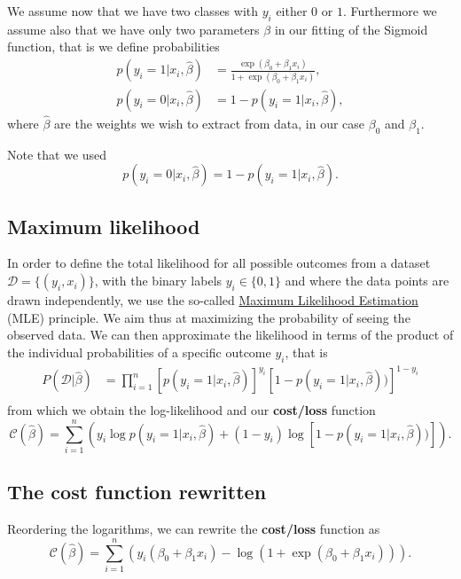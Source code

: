 \documentclass[%
oneside,                 %
final,                   %
10pt]{article}
\begin{document}
We assume now that we have two classes with $y_i$ either $0$ or $1$. Furthermore we assume also that we have only two parameters $\beta$ in our fitting of the Sigmoid function, that is we define probabilities 
\begin{align*}
p(y_i=1|x_i,\hat{\beta}) &= \frac{\exp{(\beta_0+\beta_1x_i)}}{1+\exp{(\beta_0+\beta_1x_i)}},\nonumber\\
p(y_i=0|x_i,\hat{\beta}) &= 1 - p(y_i=1|x_i,\hat{\beta}),
\end{align*}
where $\hat{\beta}$ are the weights we wish to extract from data, in our case $\beta_0$ and $\beta_1$. 

Note that we used
\[
p(y_i=0\vert x_i, \hat{\beta}) = 1-p(y_i=1\vert x_i, \hat{\beta}).
\]

\subsection*{Maximum likelihood}

In order to define the total likelihood for all possible outcomes from a  
dataset $\mathcal{D}=\{(y_i,x_i)\}$, with the binary labels
$y_i\in\{0,1\}$ and where the data points are drawn independently, we use the so-called \href{{https://en.wikipedia.org/wiki/Maximum_likelihood_estimation}}{Maximum Likelihood Estimation} (MLE) principle. 
We aim thus at maximizing 
the probability of seeing the observed data. We can then approximate the 
likelihood in terms of the product of the individual probabilities of a specific outcome $y_i$, that is 
\begin{align*}
P(\mathcal{D}|\hat{\beta})& = \prod_{i=1}^n \left[p(y_i=1|x_i,\hat{\beta})\right]^{y_i}\left[1-p(y_i=1|x_i,\hat{\beta}))\right]^{1-y_i}\nonumber \\
\end{align*}
from which we obtain the log-likelihood and our \textbf{cost/loss} function
\[
\mathcal{C}(\hat{\beta}) = \sum_{i=1}^n \left( y_i\log{p(y_i=1|x_i,\hat{\beta})} + (1-y_i)\log\left[1-p(y_i=1|x_i,\hat{\beta}))\right]\right).
\]

\subsection*{The cost function rewritten}

Reordering the logarithms, we can rewrite the \textbf{cost/loss} function as
\[
\mathcal{C}(\hat{\beta}) = \sum_{i=1}^n  \left(y_i(\beta_0+\beta_1x_i) -\log{(1+\exp{(\beta_0+\beta_1x_i)})}\right).
\]
\end{document}
